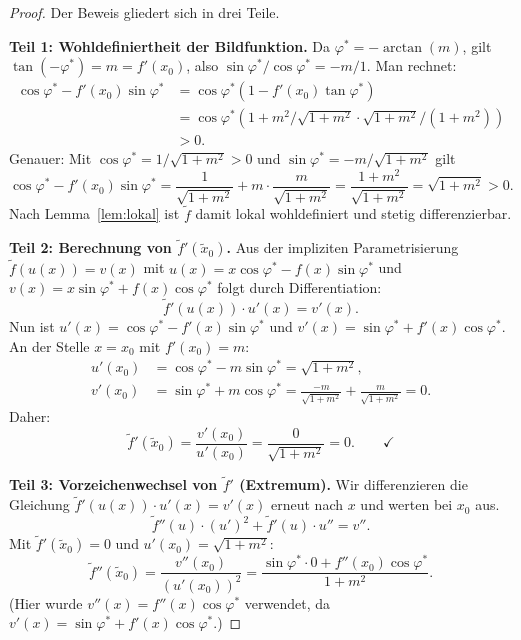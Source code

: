 ﻿\documentclass[12pt, a4paper]{article}
\theoremstyle{definition}
\begin{document}
	\begin{proof}
		Der Beweis gliedert sich in drei Teile.
		
		\medskip
		\noindent\textbf{Teil 1: Wohldefiniertheit der Bildfunktion.}
		Da $\varphi^* = -\arctan(m)$, gilt
		$\tan(-\varphi^*) = m = f'(x_0)$, also $\sin\varphi^*/\cos\varphi^* = -m/1$.
		Man rechnet:
		\begin{align*}
		\cos\varphi^* - f'(x_0)\sin\varphi^*
		&= \cos\varphi^*(1 - f'(x_0)\tan\varphi^*) \\
		&= \cos\varphi^*(1 + m^2/\sqrt{1+m^2}\cdot\sqrt{1+m^2}/(1+m^2)) \\
		&> 0.
		\end{align*}
		Genauer: Mit $\cos\varphi^* = 1/\sqrt{1+m^2} > 0$ und
		$\sin\varphi^* = -m/\sqrt{1+m^2}$ gilt
		\[
		\cos\varphi^* - f'(x_0)\sin\varphi^*
		= \frac{1}{\sqrt{1+m^2}} + m\cdot\frac{m}{\sqrt{1+m^2}}
		= \frac{1+m^2}{\sqrt{1+m^2}} = \sqrt{1+m^2} > 0.
		\]
		Nach Lemma~\ref{lem:lokal} ist $\tilde{f}$ damit lokal wohldefiniert und
		stetig differenzierbar.
		
		\medskip
		\noindent\textbf{Teil 2: Berechnung von $\tilde{f}'(\tilde{x}_0)$.}
		Aus der impliziten Parametrisierung $\tilde{f}(u(x)) = v(x)$ mit
		$u(x) = x\cos\varphi^* - f(x)\sin\varphi^*$ und
		$v(x) = x\sin\varphi^* + f(x)\cos\varphi^*$ folgt durch Differentiation:
		\[
		\tilde{f}'(u(x))\cdot u'(x) = v'(x).
		\]
		Nun ist $u'(x) = \cos\varphi^* - f'(x)\sin\varphi^*$ und
		$v'(x) = \sin\varphi^* + f'(x)\cos\varphi^*$.
		An der Stelle $x = x_0$ mit $f'(x_0) = m$:
		\begin{align*}
			u'(x_0) &= \cos\varphi^* - m\sin\varphi^* = \sqrt{1+m^2}, \\
			v'(x_0) &= \sin\varphi^* + m\cos\varphi^*
			= \frac{-m}{\sqrt{1+m^2}} + \frac{m}{\sqrt{1+m^2}} = 0.
		\end{align*}
		Daher:
		\[
		\tilde{f}'(\tilde{x}_0)
		= \frac{v'(x_0)}{u'(x_0)} = \frac{0}{\sqrt{1+m^2}} = 0. \qquad \checkmark
		\]
		
		\medskip
		\noindent\textbf{Teil 3: Vorzeichenwechsel von $\tilde{f}'$ (Extremum).}
		Wir differenzieren die Gleichung $\tilde{f}'(u(x))\cdot u'(x) = v'(x)$
		erneut nach $x$ und werten bei $x_0$ aus.
		\[
		\tilde{f}''(u)\cdot (u')^2 + \tilde{f}'(u)\cdot u'' = v''.
		\]
		Mit $\tilde{f}'(\tilde{x}_0) = 0$ und $u'(x_0) = \sqrt{1+m^2}$:
		\[
		\tilde{f}''(\tilde{x}_0) = \frac{v''(x_0)}{(u'(x_0))^2}
		= \frac{\sin\varphi^* \cdot 0 + f''(x_0)\cos\varphi^*}{1+m^2}.
		\]
		(Hier wurde $v''(x) = f''(x)\cos\varphi^*$ verwendet, da $v'(x) = \sin\varphi^* + f'(x)\cos\varphi^*$.)
		

\end{proof}
\end{document}
